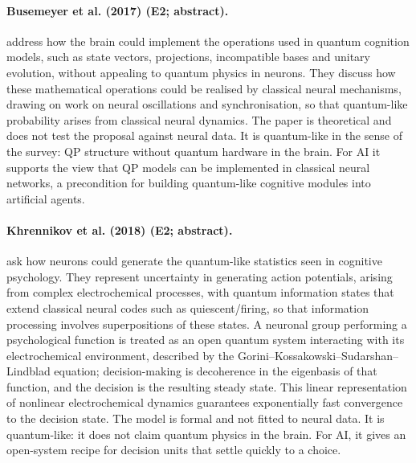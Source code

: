\documentclass[10pt,a4paper]{article}
\begin{document}
\paragraph{Busemeyer et al. (2017) (E2; abstract).} \citet{Busemeyer2017a} address how the brain could implement the operations used in quantum cognition models, such as state vectors, projections, incompatible bases and unitary evolution, without appealing to quantum physics in neurons. They discuss how these mathematical operations could be realised by classical neural mechanisms, drawing on work on neural oscillations and synchronisation, so that quantum-like probability arises from classical neural dynamics. The paper is theoretical and does not test the proposal against neural data. It is quantum-like in the sense of the survey: QP structure without quantum hardware in the brain. For AI it supports the view that QP models can be implemented in classical neural networks, a precondition for building quantum-like cognitive modules into artificial agents.

\paragraph{Khrennikov et al. (2018) (E2; abstract).} \citet{Khrennikov2018} ask how neurons could generate the quantum-like statistics seen in cognitive psychology. They represent uncertainty in generating action potentials, arising from complex electrochemical processes, with quantum information states that extend classical neural codes such as quiescent/firing, so that information processing involves superpositions of these states. A neuronal group performing a psychological function is treated as an open quantum system interacting with its electrochemical environment, described by the Gorini--Kossakowski--Sudarshan--Lindblad equation; decision-making is decoherence in the eigenbasis of that function, and the decision is the resulting steady state. This linear representation of nonlinear electrochemical dynamics guarantees exponentially fast convergence to the decision state. The model is formal and not fitted to neural data. It is quantum-like: it does not claim quantum physics in the brain. For AI, it gives an open-system recipe for decision units that settle quickly to a choice.
\end{document}
